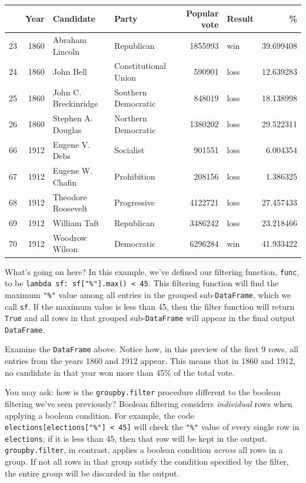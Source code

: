 \documentclass[
  letterpaper,
  DIV=11,
  numbers=noendperiod]{scrreprt}
\begin{document}
\begin{tabular}{lrllrlr}
\toprule
{} &  Year &             Candidate &                 Party &  Popular vote & Result &          \% \\
\midrule
23 &  1860 &       Abraham Lincoln &            Republican &       1855993 &    win &  39.699408 \\
24 &  1860 &             John Bell &  Constitutional Union &        590901 &   loss &  12.639283 \\
25 &  1860 &  John C. Breckinridge &   Southern Democratic &        848019 &   loss &  18.138998 \\
26 &  1860 &    Stephen A. Douglas &   Northern Democratic &       1380202 &   loss &  29.522311 \\
66 &  1912 &        Eugene V. Debs &             Socialist &        901551 &   loss &   6.004354 \\
67 &  1912 &      Eugene W. Chafin &           Prohibition &        208156 &   loss &   1.386325 \\
68 &  1912 &    Theodore Roosevelt &           Progressive &       4122721 &   loss &  27.457433 \\
69 &  1912 &          William Taft &            Republican &       3486242 &   loss &  23.218466 \\
70 &  1912 &        Woodrow Wilson &            Democratic &       6296284 &    win &  41.933422 \\
\bottomrule
\end{tabular}

What's going on here? In this example, we've defined our filtering
function, \texttt{func}, to be
\texttt{lambda\ sf:\ sf{[}"\%"{]}.max()\ \textless{}\ 45}. This
filtering function will find the maximum \texttt{"\%"} value among all
entries in the grouped sub-\texttt{DataFrame}, which we call
\texttt{sf}. If the maximum value is less than 45, then the filter
function will return \texttt{True} and all rows in that grouped
sub-\texttt{DataFrame} will appear in the final output
\texttt{DataFrame}.

Examine the \texttt{DataFrame} above. Notice how, in this preview of the
first 9 rows, all entries from the years 1860 and 1912 appear. This
means that in 1860 and 1912, no candidate in that year won more than
45\% of the total vote.

You may ask: how is the \texttt{groupby.filter} procedure different to
the boolean filtering we've seen previously? Boolean filtering considers
\emph{individual} rows when applying a boolean condition. For example,
the code \texttt{elections{[}elections{[}"\%"{]}\ \textless{}\ 45{]}}
will check the \texttt{"\%"} value of every single row in
\texttt{elections}; if it is less than 45, then that row will be kept in
the output. \texttt{groupby.filter}, in contrast, applies a boolean
condition \emph{across} all rows in a group. If not all rows in that
group satisfy the condition specified by the filter, the entire group
will be discarded in the output.
\end{document}
